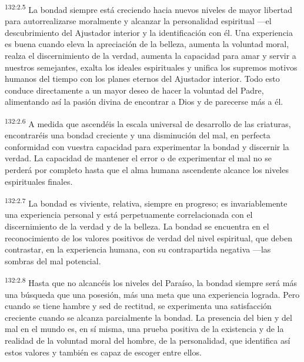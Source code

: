 \par
\textsuperscript{132:2.5} La bondad siempre está creciendo hacia nuevos niveles de mayor libertad para autorrealizarse moralmente y alcanzar la personalidad espiritual ---el descubrimiento del Ajustador interior y la identificación con él. Una experiencia es buena cuando eleva la apreciación de la belleza, aumenta la voluntad moral, realza el discernimiento de la verdad, aumenta la capacidad para amar y servir a nuestros semejantes, exalta los ideales espirituales y unifica los supremos motivos humanos del tiempo con los planes eternos del Ajustador interior. Todo esto conduce directamente a un mayor deseo de hacer la voluntad del Padre, alimentando así la pasión divina de encontrar a Dios y de parecerse más a él.

\par
\textsuperscript{132:2.6} A medida que ascendéis la escala universal de desarrollo de las criaturas, encontraréis una bondad creciente y una disminución del mal, en perfecta conformidad con vuestra capacidad para experimentar la bondad y discernir la verdad. La capacidad de mantener el error o de experimentar el mal no se perderá por completo hasta que el alma humana ascendente alcance los niveles espirituales finales.

\par
\textsuperscript{132:2.7} La bondad es viviente, relativa, siempre en progreso; es invariablemente una experiencia personal y está perpetuamente correlacionada con el discernimiento de la verdad y de la belleza. La bondad se encuentra en el reconocimiento de los valores positivos de verdad del nivel espiritual, que deben contrastar, en la experiencia humana, con su contrapartida negativa ---las sombras del mal potencial.

\par
\textsuperscript{132:2.8} Hasta que no alcancéis los niveles del Paraíso, la bondad siempre será más una búsqueda que una posesión, más una meta que una experiencia lograda. Pero cuando se tiene hambre y sed de rectitud, se experimenta una satisfacción creciente cuando se alcanza parcialmente la bondad. La presencia del bien y del mal en el mundo es, en sí misma, una prueba positiva de la existencia y de la realidad de la voluntad moral del hombre, de la personalidad, que identifica así estos valores y también es capaz de escoger entre ellos.

